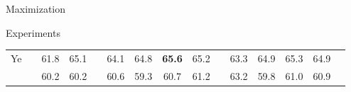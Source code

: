 \documentclass[12pt]{beamer}
\begin{document}
\begin{frame}{Maximization}
\begin{block}{Experiments}
\begin{table}
\begin{tabular}{l@{\ }c*{13}{c}}
				\hline
				\multicolumn{1}{l}{\multirow{2}{*}{Ye}} & \Cm & 61.8             & 65.1 &    & 64.1       & 64.8        & \textbf{65.6}               & 65.2          &    & 63.3       & 64.9        & 65.3                        & 64.9          \\
				\multicolumn{1}{l}{}                    & \Fm & 60.2             & 60.2 &    & 60.6       & 59.3        & 60.7                        & 61.2          &    & 63.2       & 59.8        & 61.0                        & 60.9          \\
				\bottomrule
			\end{tabular}
		\end{table}
	\end{block}
\end{frame}
\end{document}
